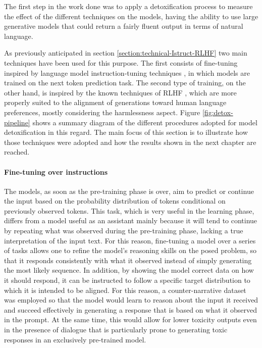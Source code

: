 The first step in the work done was to apply a detoxification process to measure the effect of the different techniques on the models, having the ability to use large generative models that could return a fairly fluent output in terms of natural language.

As previously anticipated in section \ref{section:technical-Istruct-RLHF} two main techniques have been used for this purpose. The first consists of fine-tuning inspired by language model instruction-tuning techniques \citep{NEURIPS2020_1f89885d, min-etal-2022-metaicl, NEURIPS2022_b1efde53}, in which models are trained on the next token prediction task. The second type of training, on the other hand, is inspired by the known techniques of RLHF \citep{gao2022scaling, NEURIPS2022_b1efde53, glaese2022improving}, which are more properly suited to the alignment of generations toward human language preferences, mostly considering the harmlessness aspect. Figure \ref{fig:detox-pipeline} shows a summary diagram of the different procedures adopted for model detoxification in this regard. The main focus of this section is to illustrate how those techniques were adopted and how the results shown in the next chapter are reached.

\paragraph{Fine-tuning over instructions} The models, as soon as the pre-training phase is over, aim to predict or continue the input based on the probability distribution of tokens conditional on previously observed tokens. This task, which is very useful in the learning phase, differs from a model useful as an assistant mainly because it will tend to continue by repeating what was observed during the pre-training phase, lacking a true interpretation of the input text. For this reason, fine-tuning a model over a series of tasks allows one to refine the model's reasoning skills on the posed problem, so that it responds consistently with what it observed instead of simply generating the most likely sequence. In addition, by showing the model correct data on how it should respond, it can be instructed to follow a specific target distribution to which it is intended to be aligned. For this reason, a counter-narrative dataset was employed so that the model would learn to reason about the input it received and succeed effectively in generating a response that is based on what it observed in the prompt. At the same time, this would allow for lower toxicity outputs even in the presence of dialogue that is particularly prone to generating toxic responses in an exclusively pre-trained model. 

